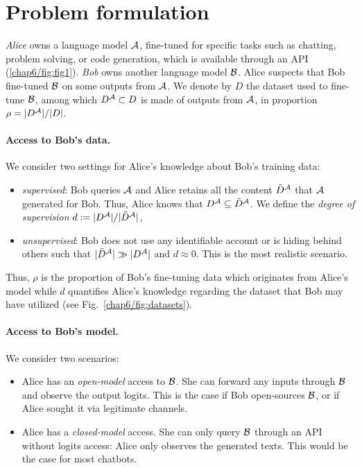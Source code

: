 
\section{Problem formulation}

\emph{Alice} owns a language model $\mathcal A$, fine-tuned for specific tasks such as chatting, problem solving, or code generation, which is available through an API (\autoref{chap6/fig:fig1}).
\emph{Bob} owns another language model $\mathcal B$.
Alice suspects that Bob fine-tuned $\mathcal B$ on some outputs from $\mathcal A$.
We denote by $D$ the dataset used to fine-tune $\mathcal B$, among which $D^{\mathcal A}\subset D$ is made of outputs from $\mathcal A$, in proportion $\rho = |D^{\mathcal A}|/|D|$.

\paragraph*{Access to Bob's data.} 
\label{chap6/sec:degreeofsupervision}

We consider two settings for Alice's knowledge about Bob's training data:
\begin{itemize}[leftmargin=0.5cm, itemsep=2pt, topsep=1pt]

    \item \emph{supervised}: Bob queries $\mathcal A$ and  Alice retains all the content $\Tilde{D}^{\mathcal A}$ that $\mathcal A$ generated for Bob. Thus, Alice knows that $D^{\mathcal A} \subseteq \Tilde{D}^{\mathcal A}$. 
    We define the \emph{degree of supervision} $d := |D^{\mathcal A}|/|\Tilde{D}^{\mathcal A}|$,  

    \item \emph{unsupervised}: Bob does not use any identifiable account or is hiding behind others such that $|\Tilde{D}^{\mathcal A}| \gg |D^{\mathcal A}|$ and $d \approx 0$.
    This is the most realistic scenario.
\end{itemize}

Thus, $\rho$ is the proportion of Bob's fine-tuning data which originates from Alice's model
while $d$ quantifies Alice's knowledge regarding the dataset that Bob may have utilized (see Fig.~\ref{chap6/fig:datasets}).

\paragraph*{Access to Bob's model.} 
We consider two scenarios:
\begin{itemize}[leftmargin=0.5cm, itemsep=2pt, topsep=1pt]
    \item Alice has an \emph{open-model} access to $\mathcal B$. 
    She can forward any inputs through $\mathcal B$ and observe the output logits.
    This is the case if Bob open-sources $\mathcal B$, or if Alice sought it via legitimate channels.
    \item Alice has a \emph{closed-model} access. 
    She can only query $\mathcal B$ through an API without logits access: Alice only observes the generated texts.
    This would be the case for most chatbots.
\end{itemize}

